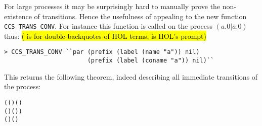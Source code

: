For large processes it may be surprisingly hard to manually prove the
non-existence of transitions.  Hence the usefulness of appealing to 
the new  function \texttt{CCS\_TRANS\_CONV}. 
For instance this function
is called on the  process $(a.0 | \bar{a}.0)$ thus:
\hl{(\mbox{} is for double-backquotes of HOL
  terms, \mbox{\color{blue}{\texttt{>}}} is HOL's prompt)}
\begin{lstlisting}
> CCS_TRANS_CONV ``par (prefix (label (name "a")) nil)
                       (prefix (label (coname "a")) nil)``
\end{lstlisting}
This returns the following theorem, indeed describing all immediate
transitions of the process:
\begin{alltt}
\HOLTokenTurnstile{}   \HOLSymConst{\ensuremath{\parallel}}   \HOLTokenTransBegin{}\HOLTokenTransEnd {} \HOLSymConst{\HOLTokenEquiv{}}
   (( \HOLSymConst{=}  ) \HOLSymConst{\HOLTokenConj{}} ( \HOLSymConst{=}  \HOLSymConst{\ensuremath{\parallel}}  ) \HOLSymConst{\HOLTokenDisj{}}
    ( \HOLSymConst{=}  ) \HOLSymConst{\HOLTokenConj{}} ( \HOLSymConst{=}   \HOLSymConst{\ensuremath{\parallel}} )) \HOLSymConst{\HOLTokenDisj{}}
   ( \HOLSymConst{=} \HOLSymConst{\ensuremath{\tau}}) \HOLSymConst{\HOLTokenConj{}} ( \HOLSymConst{=}  \HOLSymConst{\ensuremath{\parallel}} )
\end{alltt}
